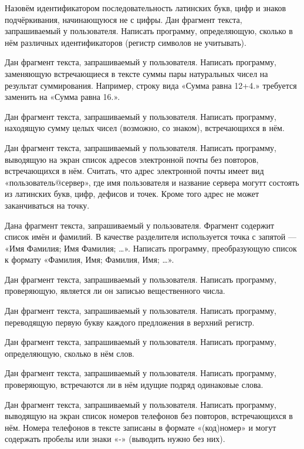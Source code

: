 \task Назовём идентификатором последовательность латинских букв, цифр
и знаков подчёркивания, начинающуюся не с цифры. Дан фрагмент текста,
запрашиваемый у пользователя. Написать программу, определяющую,
сколько в нём различных идентификаторов (регистр символов не
учитывать).

\task Дан фрагмент текста, запрашиваемый у пользователя. Написать
программу, заменяющую встречающиеся в тексте суммы пары натуральных чисел
на результат суммирования. Например, строку вида «Сумма равна 12+4.»
требуется заменить на «Сумма равна 16.».

\task Дан фрагмент текста, запрашиваемый у пользователя. Написать
программу, находящую сумму целых чисел (возможно, со знаком),
встречающихся в нём.

\task Дан фрагмент текста, запрашиваемый у пользователя. Написать
программу, выводящую на экран список адресов электронной почты без
повторов, встречающихся в нём. Считать, что адрес электронной почты
имеет вид «пользователь@сервер», где имя пользователя и название
сервера могутт состоять из латинских букв, цифр, дефисов и точек.
Кроме того адрес не может заканчиваться на точку.

\task Дана фрагмент текста, запрашиваемый у пользователя. Фрагмент
содержит список имён и фамилий. В качестве разделителя используется
точка с запятой — «Имя Фамилия; Имя Фамилия; …». Написать программу,
преобразующую список к формату «Фамилия, Имя; Фамилия, Имя; …».

\task Дан фрагмент текста, запрашиваемый у пользователя. Написать
программу, проверяющую, является ли он записью вещественного числа.

\task Дан фрагмент текста, запрашиваемый у пользователя. Написать
программу, переводящую первую букву каждого предложения в верхний
регистр.

\task Дан фрагмент текста, запрашиваемый у пользователя. Написать
программу, определяющую, сколько в нём слов.

\task Дан фрагмент текста, запрашиваемый у пользователя. Написать
программу, проверяющую, встречаются ли в нём идущие подряд одинаковые
слова.

\task Дан фрагмент текста, запрашиваемый у пользователя. Написать
программу, выводящую на экран список номеров телефонов без повторов,
встречающихся в нём. Номера телефонов в тексте записаны в формате
«(код)номер» и могут содержать пробелы или знаки «-» (выводить нужно
без них).
